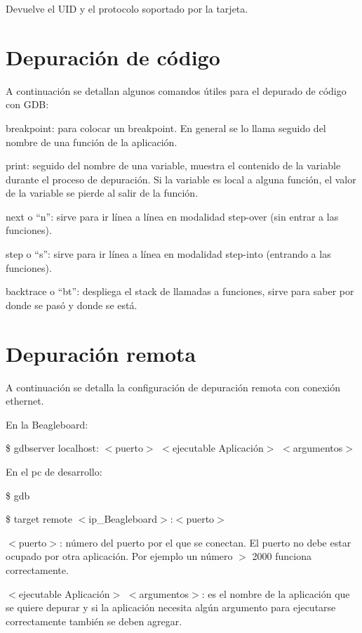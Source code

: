 Devuelve el UID y el protocolo soportado por la tarjeta.


\section{Depuración de código}\label{depurar}

A continuación se detallan algunos comandos útiles para el depurado de código con GDB:

breakpoint: para colocar un breakpoint. En general se lo llama seguido del nombre de una función de la aplicación.

print: seguido del nombre de una variable, muestra el contenido de la variable durante el proceso de depuración. Si la variable es local a alguna función, el valor de la variable se pierde al salir de la función.

next o “n”: sirve para ir línea a línea en modalidad step-over (sin entrar a las funciones).

step o “s”: sirve para ir línea a línea en modalidad step-into (entrando a las funciones).

backtrace o “bt”: despliega el stack de llamadas a funciones, sirve para saber por donde se pasó y donde se está.

\newpage
\section{Depuración remota}\label{GDB}

A continuación se detalla la configuración de depuración remota con conexión ethernet.

\bigskip
En la Beagleboard:    

\bigskip                							
\centerline{\$ gdbserver localhost: $<$puerto$>$ $<$ejecutable Aplicación$>$ $<$argumentos$>$}

\bigskip
En el pc de desarrollo:

\bigskip
\centerline{\$ gdb}

\centerline{\$ target remote $<$ip\_Beagleboard$>$:$<$puerto$>$}

\bigskip
$<$puerto$>$: número del puerto por el que se conectan. El puerto no debe estar ocupado por otra aplicación. Por ejemplo un número $>$ 2000 funciona correctamente.

\bigskip
$<$ejecutable Aplicación$>$ $<$argumentos$>$: es el nombre de la aplicación que se quiere depurar y si la aplicación necesita algún argumento para ejecutarse correctamente también se deben agregar.

